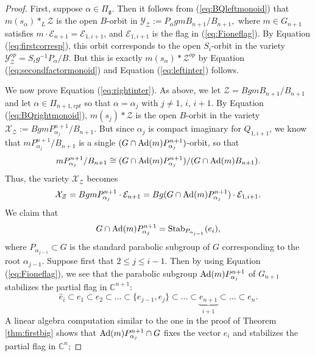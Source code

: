 \documentclass[12pt]{amsart}
\numberwithin{equation}{section}
\newcommand{\cZ}{{\mathcal Z}}
\newcommand{\fg}{\mbox{${\mathfrak g}$}}
\newcommand{\C}{\mbox{${\mathbb C}$}}
\newcommand{\Ad}{{\rm Ad}}
\newcommand{\ms}{m(s_{\alpha})}
\begin{document}
 \begin{proof}
First, suppose $\alpha\in\Pi_{\fg}$.  Then it follows from 
(\ref{eq:BQleftmonoid}) that 
$\ms*_{L}\cZ$ is the open $B$-orbit in $\mathcal{Y}_{\cZ}:=P_{\alpha} gm B_{n+1}/ B_{n+1},$ where $m\in G_{n+1}$ satisfies $m\cdot \mathcal{E}_{n+1}=\mathcal{E}_{1,i+1}$, and $\mathcal{E}_{1,i+1}$ is the flag in (\ref{eq:Fioneflag}).    By Equation (\ref{eq:firstcorresp}), this orbit corresponds to the open $S_{i}$-orbit in the variety $\mathcal{Y}_{\cZ}^{op}=S_{i} g^{-1} P_{\alpha}/B$.  But this is exactly $\ms* {\cZ}^{op}$ by Equation (\ref{eq:secondfactormonoid}) and Equation (\ref{eq:leftinter}) follows.  

We now prove Equation (\ref{eq:rightinter}).  As above, we let $\cZ=Bgm B_{n+1}/B_{n+1}$ and let $\alpha\in\Pi_{n+1,cpt}$ so that $\alpha=\alpha_{j}$ with $j\not=1,\, i,\, i+1.$  By Equation (\ref{eq:BQrightmonoid}), $m(s_{j})*\cZ$ is the open $B$-orbit in the variety $\mathcal{X}_{\cZ}:=B gm P^{n+1}_{\alpha_{j}} /B_{n+1}$. But since $\alpha_{j}$ is compact imaginary for $Q_{1,i+1}$, we know that $mP_{\alpha_{j}}^{n+1}/B_{n+1}$ is a single $(G\cap \Ad(m)P^{n+1}_{\alpha_{j}})$-orbit, so that 
\begin{equation}\label{eq:firstiso}
mP^{n+1}_{\alpha_{j}}/B_{n+1}\cong (G\cap \Ad(m)P_{\alpha_{j}}^{n+1})/(G\cap \Ad(m)B_{n+1}).
\end{equation}
Thus, the variety $\mathcal{X}_{\cZ}$ becomes 
 \begin{equation}\label{eq:XZ}
 \mathcal{X}_{\cZ}=BgmP^{n+1}_{\alpha_{j}}\cdot \mathcal{E}_{n+1}=B g(G\cap\Ad(m) P_{\alpha_{j}}^{n+1})\cdot \mathcal{E}_{1,i+1}.
 \end{equation}
 We claim that 
 \begin{equation}\label{eq:groupclaim}
 G\cap \Ad(m)P_{\alpha_{j}}^{n+1}=\mbox{Stab}_{P_{\alpha_{j-1}}}(e_{i}),
 \end{equation}
 where $P_{\alpha_{j-1}}\subset G$ is the standard parabolic subgroup of $G$ corresponding to the root $\alpha_{j-1}$.   Suppose first that $2\leq j\leq i-1$.  Then by using Equation (\ref{eq:Fioneflag}), we see that the parabolic subgroup $\Ad(m)P_{\alpha_{j}}^{n+1}$ of $G_{n+1}$ stabilizes the partial flag in $\C^{n+1}$:
 $$
 \hat{e}_{i}\subset e_{1}\subset e_{2}\subset\dots\subset \{e_{j-1}, e_{j}\}\subset \dots \subset \underbrace{e_{n+1}}_{i+1}\subset \dots \subset e_{n}. 
 $$
 A linear algebra computation similar to the one in the proof of Theorem \ref{thm:firstbig} shows that $\Ad(m)P_{\alpha_{j}}^{n+1}\cap G$ fixes the vector $e_{i}$ and stabilizes the partial flag in $\C^{n}$;

\end{proof}
\end{document}
